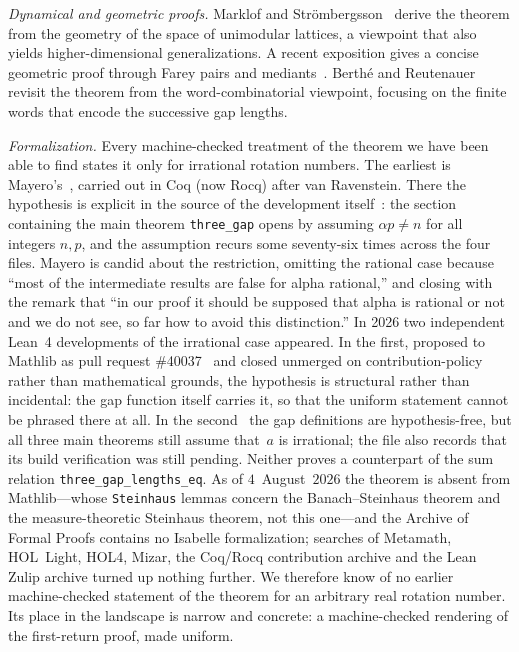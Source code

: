 \documentclass[11pt,reqno]{amsart}
\theoremstyle{plain}
\theoremstyle{definition}
\theoremstyle{remark}
\newcommand{\code}[1]{\texttt{#1}}
\begin{document}
\emph{Dynamical and geometric proofs.}  Marklof and
Str\"ombergsson~\cite{MarklofStrombergsson2017} derive the theorem from the
geometry of the space of unimodular lattices, a viewpoint that also yields
higher-dimensional generalizations.  A recent exposition gives a concise
geometric proof through Farey pairs and mediants~\cite{Geometric2023}.
Berth\'e and Reutenauer~\cite{BertheReutenauer2024} revisit the theorem from
the word-combinatorial viewpoint, focusing on the finite words that encode the
successive gap lengths.

\emph{Formalization.}  Every machine-checked treatment of the theorem we have
been able to find states it only for irrational rotation numbers.  The
earliest is Mayero's~\cite{Mayero2000}, carried out in Coq (now Rocq) after
van Ravenstein.  There the hypothesis is explicit in the source of the
development itself~\cite{MayeroCoq1998}: the section containing the main
theorem \code{three\_gap} opens by assuming $\alpha p \ne n$ for all
integers $n,p$, and the assumption recurs some seventy-six times across the
four files.  Mayero is candid about the restriction, omitting the rational
case because ``most of the intermediate results are false for alpha
rational,'' and closing with the remark that ``in our proof it should be
supposed that alpha is rational or not and we do not see, so far how to avoid
this distinction.''  In 2026 two independent Lean~4 developments of the
irrational case appeared.  In the first, proposed to Mathlib as pull
request \#40037~\cite{SaarShai2026} and closed unmerged on
contribution-policy rather than mathematical grounds, the hypothesis is
structural rather than incidental: the gap function itself carries it, so
that the uniform statement cannot be phrased there at all.  In the
second~\cite{LeanGenius2026} the gap definitions are hypothesis-free, but all
three main theorems still assume that~$a$ is irrational; the file also
records that its build verification was still pending.  Neither proves a
counterpart of the sum relation \code{three\_gap\_lengths\_eq}.  As of
$4$~August~$2026$ the theorem is absent from Mathlib---whose \code{Steinhaus}
lemmas concern the Banach--Steinhaus theorem and the measure-theoretic
Steinhaus theorem, not this one---and the Archive of Formal Proofs contains
no Isabelle formalization; searches of Metamath, HOL~Light, HOL4, Mizar, the
Coq/Rocq contribution archive and the Lean Zulip archive turned up nothing
further.  We therefore know of no earlier machine-checked statement of the
theorem for an arbitrary real rotation number.  Its place in the landscape is
narrow and concrete: a machine-checked rendering of the first-return proof,
made uniform.
\end{document}
